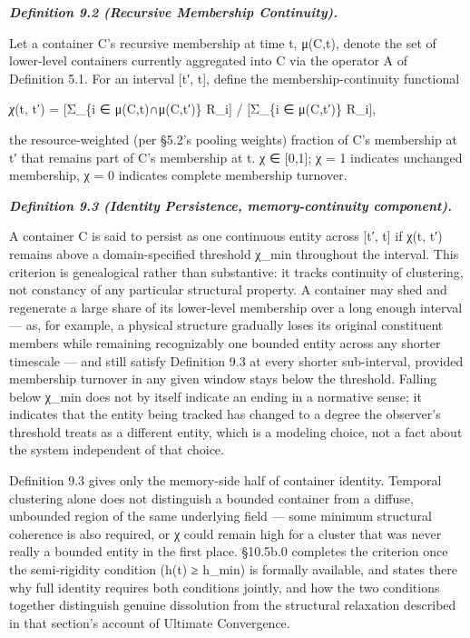 \documentclass[
]{article}
\begin{document}
\emph{\textbf{Definition 9.2 (Recursive Membership Continuity).}}

Let a container C's recursive membership at time t, μ(C,t), denote the
set of lower-level containers currently aggregated into C via the
operator A of Definition 5.1. For an interval {[}t′, t{]}, define the
membership-continuity functional

\emph{χ}(t, t′) = {[}Σ\_\{i ∈ μ(C,t)∩μ(C,t′)\} R\_i{]} / {[}Σ\_\{i ∈
μ(C,t′)\} R\_i{]},

the resource-weighted (per §5.2's pooling weights) fraction of C's
membership at t′ that remains part of C's membership at t. χ ∈
{[}0,1{]}; χ = 1 indicates unchanged membership, χ = 0 indicates
complete membership turnover.

\emph{\textbf{Definition 9.3 (Identity Persistence, memory-continuity
component).}}

A container C is said to persist as one continuous entity across {[}t′,
t{]} if χ(t, t′) remains above a domain-specified threshold χ\_min
throughout the interval. This criterion is genealogical rather than
substantive: it tracks continuity of clustering, not constancy of any
particular structural property. A container may shed and regenerate a
large share of its lower-level membership over a long enough interval
--- as, for example, a physical structure gradually loses its original
constituent members while remaining recognizably one bounded entity
across any shorter timescale --- and still satisfy Definition 9.3 at
every shorter sub-interval, provided membership turnover in any given
window stays below the threshold. Falling below χ\_min does not by
itself indicate an ending in a normative sense; it indicates that the
entity being tracked has changed to a degree the observer's threshold
treats as a different entity, which is a modeling choice, not a fact
about the system independent of that choice.

Definition 9.3 gives only the memory-side half of container identity.
Temporal clustering alone does not distinguish a bounded container from
a diffuse, unbounded region of the same underlying field --- some
minimum structural coherence is also required, or χ could remain high
for a cluster that was never really a bounded entity in the first place.
§10.5b.0 completes the criterion once the semi-rigidity condition (h(t)
≥ h\_min) is formally available, and states there why full identity
requires both conditions jointly, and how the two conditions together
distinguish genuine dissolution from the structural relaxation described
in that section's account of Ultimate Convergence.
\end{document}
